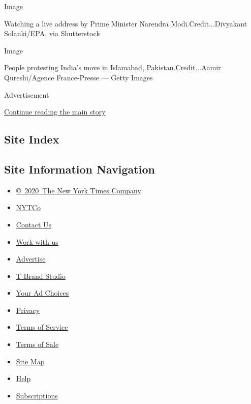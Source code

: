 Image

Watching a live address by Prime Minister Narendra
Modi.Credit...Divyakant Solanki/EPA, via Shutterstock

Image

People protesting India's move in Islamabad, Pakistan.Credit...Aamir
Qureshi/Agence France-Presse --- Getty Images

Advertisement

\protect\hyperlink{after-bottom}{Continue reading the main story}

\hypertarget{site-index}{%
\subsection{Site Index}\label{site-index}}

\hypertarget{site-information-navigation}{%
\subsection{Site Information
Navigation}\label{site-information-navigation}}

\begin{itemize}
\tightlist
\item
  \href{https://help.nytimes.com/hc/en-us/articles/115014792127-Copyright-notice}{©~2020~The
  New York Times Company}
\end{itemize}

\begin{itemize}
\tightlist
\item
  \href{https://www.nytco.com/}{NYTCo}
\item
  \href{https://help.nytimes.com/hc/en-us/articles/115015385887-Contact-Us}{Contact
  Us}
\item
  \href{https://www.nytco.com/careers/}{Work with us}
\item
  \href{https://nytmediakit.com/}{Advertise}
\item
  \href{http://www.tbrandstudio.com/}{T Brand Studio}
\item
  \href{https://www.nytimes.com/privacy/cookie-policy\#how-do-i-manage-trackers}{Your
  Ad Choices}
\item
  \href{https://www.nytimes.com/privacy}{Privacy}
\item
  \href{https://help.nytimes.com/hc/en-us/articles/115014893428-Terms-of-service}{Terms
  of Service}
\item
  \href{https://help.nytimes.com/hc/en-us/articles/115014893968-Terms-of-sale}{Terms
  of Sale}
\item
  \href{https://spiderbites.nytimes.com}{Site Map}
\item
  \href{https://help.nytimes.com/hc/en-us}{Help}
\item
  \href{https://www.nytimes.com/subscription?campaignId=37WXW}{Subscriptions}
\end{itemize}
